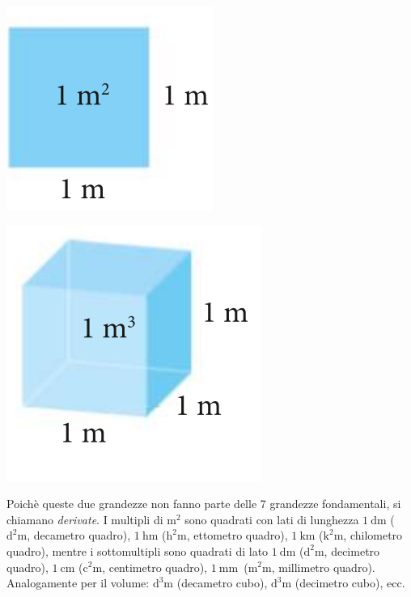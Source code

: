 \documentclass[12pt,a4paper,oneside]{book}
\theoremstyle{esercizio}
\begin{document}
\begin{minipage}{\linewidth}
	\centering
	\includegraphics[scale=0.3]{img/quad}
	\label{fig:quad}
\end{minipage}
\begin{minipage}{\linewidth}
	\centering
	\includegraphics[scale=0.3]{img/cub}
	\label{fig:cub}
\end{minipage}


Poichè queste due grandezze non fanno parte delle 7 grandezze fondamentali, si chiamano \textit{derivate}. I multipli di \(\si{\square\meter}\) sono quadrati con lati di lunghezza \(\SI{1}{\deca\meter}\) (\(\si{\square\deca\meter}\), decametro quadro), \(\SI{1}{\hecto\meter}\) (\(\si{\square\hecto\meter}\), ettometro quadro), \(\SI{1}{\kilo\meter}\) (\(\si{\square\kilo\meter}\), chilometro quadro), mentre i sottomultipli sono quadrati di lato \(\SI{1}{\deci\meter}\) (\(\si{\square\deci\meter}\), decimetro quadro), \(\SI{1}{\centi\meter}\) (\(\si{\square\centi\meter}\), centimetro quadro), \(\SI{1}{\milli\meter}\)\ (\(\si{\square\milli\meter}\), millimetro quadro). Analogamente per il volume: \(\si{\cubic\deca\meter}\) (decametro cubo), \(\si{\cubic\deci\meter}\) (decimetro cubo), ecc.
\end{document}
